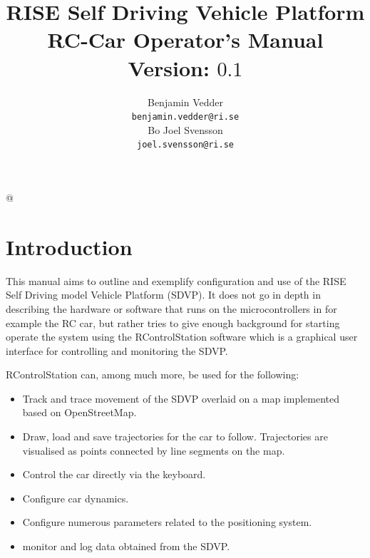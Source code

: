 \documentclass[12pt]{article} %
\makeatletter
\renewcommand{\maketitle}{\bgroup\setlength{\parindent}{0pt}
  \thispagestyle{empty}
  \begin{flushleft}
    \textbf{\@title}

    \vspace{3cm}
    
    \@author
    
    \begin{center}
    \end{center}
      
  \end{flushleft}\egroup
}
\newcommand{\GUIDEVERSION}[0]{$0.1$}
\newcommand{\GUIDETITLE}[0]{RISE Self Driving Vehicle Platform \newline \noindent
  RC-Car Operator's Manual \newline \noindent Version: \GUIDEVERSION{}}
\makeatother
\begin{document}
\title{\GUIDETITLE}


\author{Benjamin Vedder\\ \texttt{benjamin.vedder@ri.se}\\ \vspace{5mm} Bo Joel Svensson\\ \texttt{joel.svensson@ri.se}} 

\lstMakeShortInline[]@

\maketitle



\newpage
\tableofcontents{}
\newpage


\section{Introduction}

This manual aims to outline and exemplify configuration and use of the
RISE Self Driving model Vehicle Platform (SDVP). It does not go in
depth in describing the hardware or software that runs on the
microcontrollers in for example the RC car, but rather tries to give
enough background for starting operate the system using the
RControlStation software which is a graphical user interface for
controlling and monitoring the SDVP.

RControlStation can, among much more, be used for the following:
\begin{itemize}
\item Track and trace movement of the SDVP overlaid on a map
  implemented based on OpenStreetMap.
\item Draw, load and save trajectories for the car to
  follow. Trajectories are visualised as points connected by line
  segments on the map.
\item Control the car directly via the keyboard.
\item Configure car dynamics.
\item Configure numerous parameters related to the positioning system.
\item monitor and log data obtained from the SDVP. 
\end{itemize} 
\end{document}
